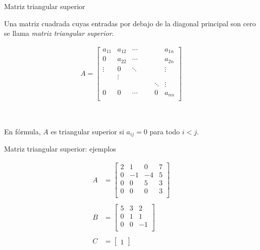 \documentclass[handout]{beamer} %
\renewcommand{\_}[1]{_{\left[ #1 \right]}}
\renewcommand{\^}[1]{^{\left[ #1 \right]}}
\begin{document}
\begin{frame}{Matriz triangular superior}
    
    Una matriz cuadrada cuyas entradas por debajo de la diagonal principal son cero se llama \textit{matriz triangular superior}.
    
    
    \begin{align*}
        A=
        \left[
        \begin{array}{ccccccc}
            a_{11} & a_{12} & \cdots & & &  & a_{1n}\\ 
            0 & a_{22} & \cdots & & &  & a_{2n}\\
            \vdots & 0 & \ddots & & &  & \vdots\\
            & \vdots &  & & &&  \\
            & &  & & &\ddots& \vdots \\
            0 & 0 & \cdots & & & 0& a_{nn}\\ 
        \end{array}
        \right]
    \end{align*}
    
    \
    
    En fórmula, $A$ es triangular superior si $a_{ij}=0$ para todo $i<j$.
\end{frame}

\begin{frame}{Matriz triangular superior:  ejemplos }
    
    \begin{align*}
        A&=
        \begin{bmatrix}
            2 & 1 & 0 & 7\\ 
            0 & -1 & -4& 5\\
            0&0 & 5 & 3 \\
            0&0& 0 & 3 \\
        \end{bmatrix}
        \\
    &
        \\
        B&=
        \begin{bmatrix}
            5 &  3 & 2\\ 
            0 & 1  & 1\\
            0& 0 & -1 \\
        \end{bmatrix}
        \\
    &
        \\
        C&=
        \begin{bmatrix}
            1
        \end{bmatrix}
    \end{align*}

    \vskip 1cm
\end{frame}
\end{document}
